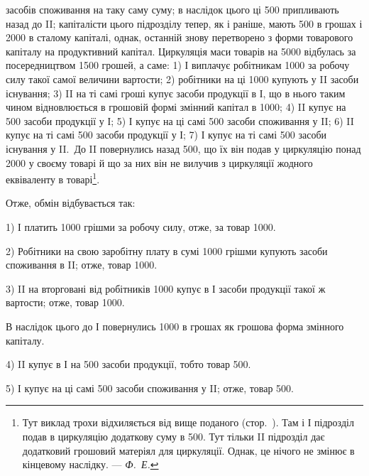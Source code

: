 \parcont{}  %
засобів споживання на таку саму суму; в наслідок цього ці 500
припливають назад до II; капіталісти цього підрозділу тепер, як і раніше,
мають 500 в грошах і 2000 в сталому капіталі,
однак, останній знову перетворено з форми товарового капіталу на продуктивний
капітал. Циркуляція маси товарів на 5000 відбулась
за посередництвом 1500 грошей, а саме: 1) І виплачує робітникам
1000 за робочу силу такої самої величини вартости;
2) робітники на ці 1000 купують у II засоби існування;
3) II на ті самі гроші купує засоби продукції в І, що в нього таким
чином відновлюється в грошовій формі змінний капітал в 1000;
4) II купує на 500 засоби продукції у І;
5) І купує на ці самі 500 засоби споживання у II;
6) II купує на ті самі 500 засоби продукції у І;
7) І купує на ті самі 500 засоби
існування у II.~До II повернулись назад 500, що їх він подав у
циркуляцію понад 2000 у своєму товарі й що за них він не
вилучив з циркуляції жодного еквіваленту в товарі\footnote{
Тут виклад трохи відхиляється від вище поданого (стор.~\pageref{original-305-2}). Там і
І підрозділ подав в циркуляцію додаткову суму в 500. Тут тільки II підрозділ дає
додатковий грошовий матеріял для циркуляції. Однак, це нічого не змінює в
кінцевому наслідку. — \emph{Ф.~Е.}}.

Отже, обмін відбувається так:

1) І платить 1000 грішми за робочу силу, отже, за товар \deq{} 1000.

2) Робітники на свою заробітну плату в сумі 1000 грішми
купують засоби споживання в II; отже, товар \deq{} 1000.

3) II на вторговані від робітників 1000 купує в І засоби
продукції такої ж вартости; отже, товар \deq{} 1000.

В наслідок цього до І повернулись 1000 в грошах як грошова
форма змінного капіталу.

4) II купує в І на 500 засоби продукції, тобто товар \deq{}
500.

5) І купує на ці самі 500 засоби споживання у II; отже,
товар \deq{} 500.

